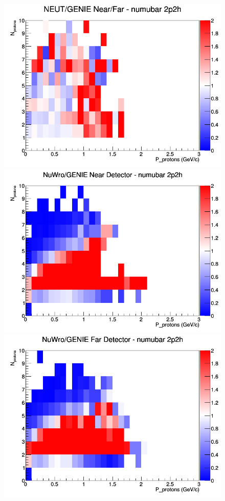 \documentclass[12pt]{article}
\begin{document}
\begin{figure}[h]
\endminipage
{}
\includegraphics[width=\linewidth]{N_P/nominal/protons/ratios/2p2h_NEUT_GENIE_numubar_NF_N_P.png}
\endminipage
\newline
{}
\includegraphics[width=\linewidth]{N_P/nominal/protons/ratios/2p2h_NuWro_GENIE_numubar_near_N_P.png}
\endminipage
{}
\includegraphics[width=\linewidth]{N_P/nominal/protons/ratios/2p2h_NuWro_GENIE_numubar_far_N_P.png}

\end{figure}
\end{document}
